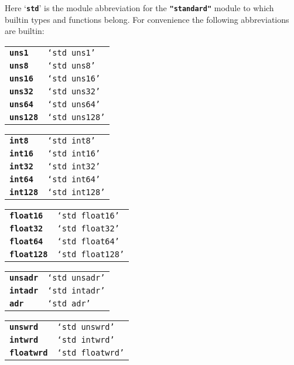 \documentclass[12pt]{article}
\makeatletter
\newcommand{\TT}[1]{{\tt \bfseries #1}}
\newcommand{\ttkey}[1]{\TT{#1}\index{#1@{\tt #1}}}
\newcommand{\ABV}{-{}-{}->}		%
\newenvironment{indpar}[1][0.3in]%
	{\begin{list}{}%
		     {\setlength{\itemsep}{0in}%
		      \setlength{\topsep}{0in}%
		      \setlength{\parsep}{1ex}%
		      \setlength{\labelwidth}{#1}%
		      \setlength{\leftmargin}{#1}%
		      \addtolength{\leftmargin}{\labelsep}}%
	 \item}%
	{\end{list}}
\makeatother
\begin{document}
Here `\TT{std}' is the module abbreviation for the \TT{"standard"}
module to which builtin types and functions belong.  For convenience
the following abbreviations are builtin:
\begin{indpar}
\begin{tabular}{p{0.8in}@{\tt ~\ABV~}l}
\ttkey{uns1} & {\tt `std~uns1'} \\
\ttkey{uns8} & {\tt `std~uns8'} \\
\ttkey{uns16} & {\tt `std~uns16'} \\
\ttkey{uns32} & {\tt `std~uns32'} \\
\ttkey{uns64} & {\tt `std~uns64'} \\
\ttkey{uns128} & {\tt `std~uns128'} \\
\end{tabular}

\begin{tabular}{p{0.8in}@{\tt ~\ABV~}l}
\ttkey{int8} & {\tt `std~int8'} \\
\ttkey{int16} & {\tt `std~int16'} \\
\ttkey{int32} & {\tt `std~int32'} \\
\ttkey{int64} & {\tt `std~int64'} \\
\ttkey{int128} & {\tt `std~int128'} \\
\end{tabular}

\begin{tabular}{p{0.8in}@{\tt ~\ABV~}l}
\ttkey{float16} & {\tt `std~float16'} \\
\ttkey{float32} & {\tt `std~float32'} \\
\ttkey{float64} & {\tt `std~float64'} \\
\ttkey{float128} & {\tt `std~float128'} \\
\end{tabular}

\begin{tabular}{p{0.8in}@{\tt ~\ABV~}l}
\ttkey{unsadr} & {\tt `std~unsadr'} \\
\ttkey{intadr} & {\tt `std~intadr'} \\
\ttkey{adr} & {\tt `std~adr'} \\
\end{tabular}

\begin{tabular}{p{0.8in}@{\tt ~\ABV~}l}
\ttkey{unswrd} & {\tt `std~unswrd'} \\
\ttkey{intwrd} & {\tt `std~intwrd'} \\
\ttkey{floatwrd} & {\tt `std~floatwrd'} \\
\end{tabular}
\end{indpar}
\end{document}
